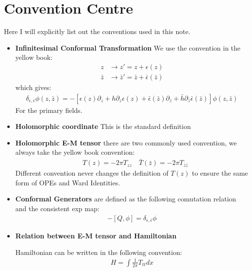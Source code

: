 \section{Convention Centre}\label{sec:Convention Centre} %

Here I will explicitly list out the conventions used in this note.
\begin{itemize}
  \item \textbf{Infinitesimal Conformal Transformation} We use the
    convention in the yellow book:
    \begin{align}
      z &\to z' = z + \epsilon(z) \\
      \bar{z} &\to \bar{z}' = \bar{z} + \bar{\epsilon}(\bar{z})
    \end{align}
    which gives:
    \begin{align}
      \delta_{\epsilon,\bar{\epsilon}} \phi(z,\bar{z}) = - \left[
        \epsilon(z) \partial_z + h \partial_z \epsilon(z) +
        \bar{\epsilon}(\bar{z}) \partial_{\bar{z}} + \bar{h}
      \partial_{\bar{z}} \bar{\epsilon}(\bar{z}) \right] \phi(z,\bar{z})
    \end{align}
    For the primary fields.
  \item \textbf{Holomorphic coordinate} This is the standard definition

  \item \textbf{Holomorphic E-M tensor} there are two commonly used
    convention, we always take the yellow book convention:
    \begin{align}
      \quad T(z) = -2 \pi T_{zz} \quad \bar{T}(\bar{z}) = -2 \pi
      T_{\bar{z}\bar{z}}
    \end{align}
    Different convention never changes the definition of $ T(z) $ to
    ensure the same form of OPEs and Ward Identities.
  \item \textbf{Conformal Generators} are defined as the following
    comutation relation and the consistent exp map:
    \begin{align}
      -[Q,\phi] = \delta_{\epsilon,\bar{\epsilon}} \phi
    \end{align}
  \item \textbf{Relation between E-M tensor and Hamiltonian}

    Hamiltonian can be written in the following convention:
    \begin{align}
      H = \int \displaystyle\frac{1}{2 \pi} T_{tt} dx
    \end{align}
\end{itemize}

